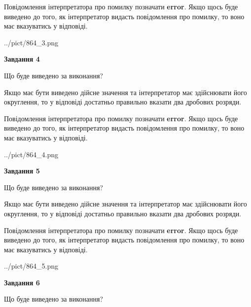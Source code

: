 \documentclass[12pt, ukrainian]{article}
\begin{document}
{\begin {Large}
Повідомлення інтерпретатора про помилку позначати \textbf{error}.
Якщо щось буде виведено до того, як інтерпретатор видасть повідомлення про помилку, 
то воно має вказуватись у відповіді. \par

\begin{center}
	{../pict/864_3.png}
\end{center}
\newpage

{\begin {center}\textbf{Завдання 4}\end {center}}\par
Що буде виведено за виконання? \par

Якщо має бути виведено дійсне значення та інтерпретатор має здійснювати його округлення, 
то у відповіді достатньо правильно вказати два дробових розряди.

Повідомлення інтерпретатора про помилку позначати \textbf{error}.
Якщо щось буде виведено до того, як інтерпретатор видасть повідомлення про помилку, 
то воно має вказуватись у відповіді. \par

\begin{center}
	{../pict/864_4.png}
\end{center}
\newpage

{\begin {center}\textbf{Завдання 5}\end {center}}\par
Що буде виведено за виконання? \par

Якщо має бути виведено дійсне значення та інтерпретатор має здійснювати його округлення, 
то у відповіді достатньо правильно вказати два дробових розряди.

Повідомлення інтерпретатора про помилку позначати \textbf{error}.
Якщо щось буде виведено до того, як інтерпретатор видасть повідомлення про помилку, 
то воно має вказуватись у відповіді. \par

\begin{center}
	{../pict/864_5.png}
\end{center}
\newpage

{\begin {center}\textbf{Завдання 6}\end {center}}\par
Що буде виведено за виконання? \par


\end{Large}}
\end{document}
